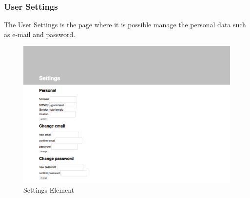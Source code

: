\subsubsection{User Settings}

The User Settings is the page where it is possible manage the personal data such as e-mail and password.

\begin {figure}[h]
\graphicspath{{images/chapter_USR/}}
\includegraphics[width=\textwidth]{usr2}
\caption{Settings  Element}
\end {figure}
